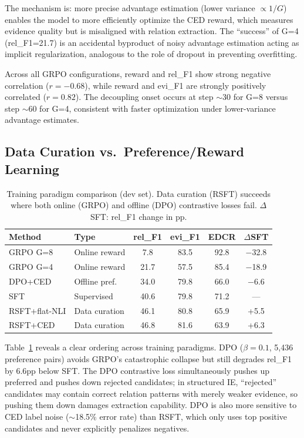 \documentclass[11pt]{article}
\begin{document}
The mechanism is: more precise advantage estimation (lower variance $\propto 1/G$) enables the model to more efficiently optimize the CED reward, which measures evidence quality but is misaligned with relation extraction. The ``success'' of G=4 (rel\_F1=21.7) is an accidental byproduct of noisy advantage estimation acting as implicit regularization, analogous to the role of dropout in preventing overfitting.

Across all GRPO configurations, reward and rel\_F1 show strong negative correlation ($r{=}{-}0.68$), while reward and evi\_F1 are strongly positively correlated ($r{=}0.82$). The decoupling onset occurs at step ${\sim}$30 for G=8 versus step ${\sim}$60 for G=4, consistent with faster optimization under lower-variance advantage estimates.

\subsection{Data Curation vs.\ Preference/Reward Learning}

\begin{table}[t]
\centering
\small
\begin{tabular}{llcccc}
\toprule
\textbf{Method} & \textbf{Type} & \textbf{rel\_F1} & \textbf{evi\_F1} & \textbf{EDCR} & \textbf{$\Delta$SFT} \\
\midrule
GRPO G=8 & Online reward & 7.8 & 83.5 & 92.8 & $-$32.8 \\
GRPO G=4 & Online reward & 21.7 & 57.5 & 85.4 & $-$18.9 \\
DPO+CED & Offline pref. & 34.0 & 79.8 & 66.0 & $-$6.6 \\
SFT & Supervised & 40.6 & 79.8 & 71.2 & --- \\
RSFT+flat-NLI & Data curation & 46.1 & 80.8 & 65.9 & +5.5 \\
RSFT+CED & Data curation & 46.8 & 81.6 & 63.9 & +6.3 \\
\bottomrule
\end{tabular}
\caption{Training paradigm comparison (dev set). Data curation (RSFT) succeeds where both online (GRPO) and offline (DPO) contrastive losses fail. $\Delta$SFT: rel\_F1 change in pp.}
\label{tab:spectrum}
\end{table}

Table~\ref{tab:spectrum} reveals a clear ordering across training paradigms.
DPO ($\beta{=}0.1$, 5{,}436 preference pairs) avoids GRPO's catastrophic collapse but still degrades rel\_F1 by 6.6pp below SFT.
The DPO contrastive loss simultaneously pushes up preferred and pushes down rejected candidates; in structured IE, ``rejected'' candidates may contain correct relation patterns with merely weaker evidence, so pushing them down damages extraction capability.
DPO is also more sensitive to CED label noise (${\sim}$18.5\% error rate) than RSFT, which only uses top positive candidates and never explicitly penalizes negatives.
\end{document}
